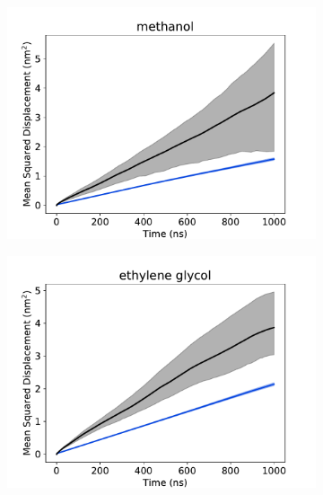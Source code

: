 \documentclass{article}
\begin{document}
  \begin{figure}
  \centering
  \begin{subfigure}{0.45\textwidth}
  \includegraphics[width=\textwidth]{msd_MET.pdf}
  \caption{}\label{fig:msd_MET}
  \end{subfigure}
  \begin{subfigure}{0.45\textwidth}
  \includegraphics[width=\textwidth]{msd_GCL.pdf}
  \caption{}\label{fig:msd_GCL}
  \end{subfigure}
  \begin{subfigure}{0.45\textwidth}

\end{subfigure}
\end{figure}
\end{document}
